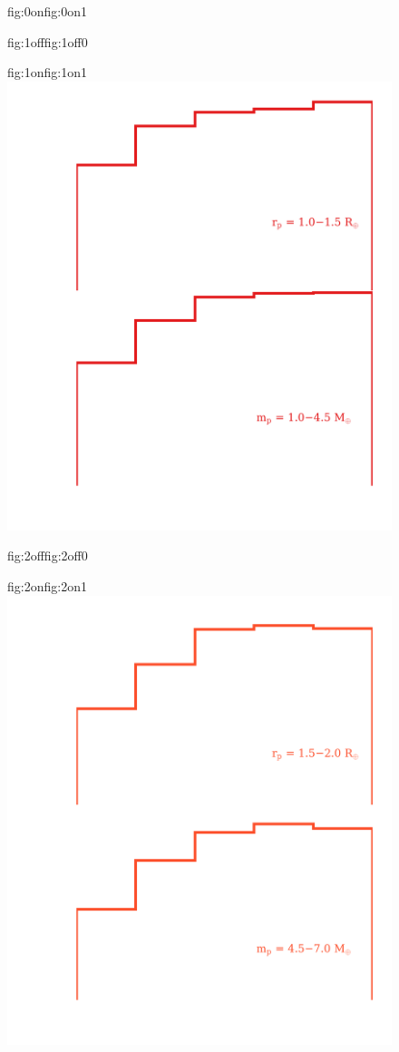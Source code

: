 \begin{figure}
\begin{ocg}{fig:0on}{fig:0on}{1}
  \end{ocg}
  \hspace{-0.8\hsize}%
  \begin{ocg}{fig:1off}{fig:1off}{0}%
  \end{ocg}%
  \begin{ocg}{fig:1on}{fig:1on}{1}%
    \includegraphics[width=0.8\hsize]{figures/mpoccurrence_1.png}%
  \end{ocg}
  \hspace{-0.8\hsize}%
  \begin{ocg}{fig:2off}{fig:2off}{0}%
  \end{ocg}%
  \begin{ocg}{fig:2on}{fig:2on}{1}%
    \includegraphics[width=0.8\hsize]{figures/mpoccurrence_2.png}%

\end{ocg}
\end{figure}
